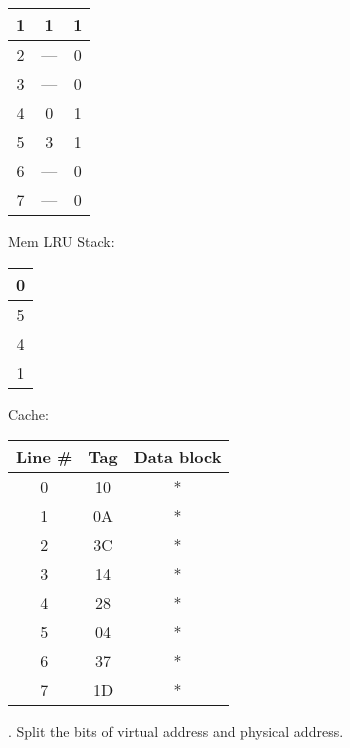 \documentclass{article}
\begin{document}
{\begin{table}[h!]
\begin{tabular}{|c|c|c|}
              1 & 1 & 1 \\ \hline
              2 & --- & 0 \\ \hline
              3 & --- & 0 \\ \hline
              4 & 0 & 1 \\ \hline
              5 & 3 & 1 \\ \hline
              6 & --- & 0 \\ \hline
              7 & --- & 0 \\ \hline
          \end{tabular}
     \end{table}
     \linebreak
     Mem LRU Stack: \\
     \begin{table}[h!]
          \centering
          \begin{tabular}{|c|}
              \hline
              0 \\ \hline
              5 \\ \hline
              4 \\ \hline
              1 \\ \hline
          \end{tabular}
     \end{table}
     \linebreak
     Cache: \\
     \begin{table}[h]
          \centering
          \begin{tabular}{|c|c|c|}
              \hline
              \textbf{Line \#} & \textbf{Tag} & \textbf{Data block} \\ \hline
              0 & 10 & * \\ \hline
              1 & 0A & * \\ \hline
              2 & 3C & * \\ \hline
              3 & 14 & * \\ \hline
              4 & 28 & * \\ \hline
              5 & 04 & * \\ \hline
              6 & 37 & * \\ \hline
              7 & 1D & * \\ \hline
          \end{tabular}
     \end{table}
     \linebreak
     . Split the bits of virtual address and physical address. \\
}
\end{document}
